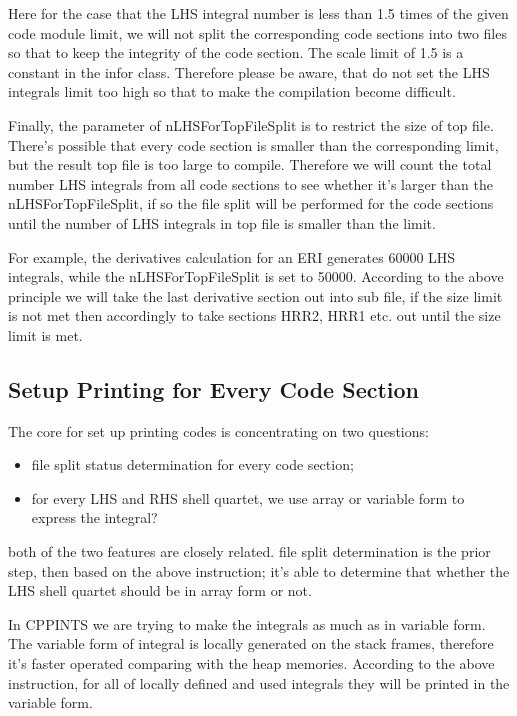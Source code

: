 Here for the case that the LHS integral number is less than 1.5 times of the given
code module limit, we will not split the corresponding code sections into two files
so that to keep the integrity of the code section. The scale limit of 1.5 is a 
constant in the infor class. Therefore please be aware, that do not set the 
LHS integrals limit too high so that to make the compilation become difficult.

Finally, the parameter of nLHSForTopFileSplit is to restrict the size of top file.
There's possible that every code section is smaller than the corresponding limit,
but the result top file is too large to compile. Therefore we will count the 
total number LHS integrals from all code sections to see whether it's larger than
the nLHSForTopFileSplit, if so the file split will be performed for the code sections
until the number of LHS integrals in top file is smaller than the limit.

For example, the derivatives calculation for an ERI generates 60000 LHS integrals, while
the nLHSForTopFileSplit is set to 50000. According to the above principle we will take
the last derivative section out into sub file, if the size limit is not met then accordingly
to take sections HRR2, HRR1 etc. out until the size limit is met.

\subsection{Setup Printing for Every Code Section}
\label{code_generation_print}

The core for set up printing codes is concentrating on two questions:
\begin{itemize}
 \item file split status determination for every code section;
 \item for every LHS and RHS shell quartet, we use array or variable
 form to express the integral?
\end{itemize}
both of the two features are closely related. file split determination
is the prior step, then based on the above instruction; it's able to 
determine that whether the LHS shell quartet should be in array form 
or not.

In CPPINTS we are trying to make the integrals as much as in variable form.
The variable form of integral is locally generated on
the stack frames, therefore it's faster operated comparing with the heap memories.
According to the above instruction, for all of locally defined and used integrals 
they will be printed in the variable form.

